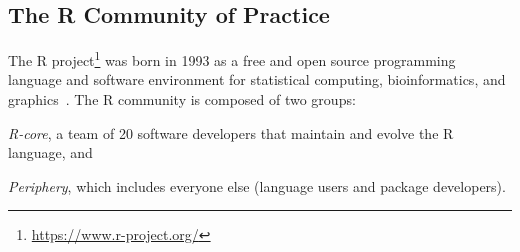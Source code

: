 



\subsection{The R Community of Practice}
    
    The R project\footnote{\url{https://www.r-project.org/}} was born in 1993 as a free and open source programming language and software environment for statistical computing, bioinformatics, and graphics~\cite{Ihaka1996}.
    The R community is composed of two groups:
    \begin{enumerate*}[label=(\arabic*)]
      \item \textit{R-core}, a team of 20 software developers that maintain and evolve the R language, and
      \item \textit{Periphery}, which includes everyone else (language users and package developers).
    \end{enumerate*}


